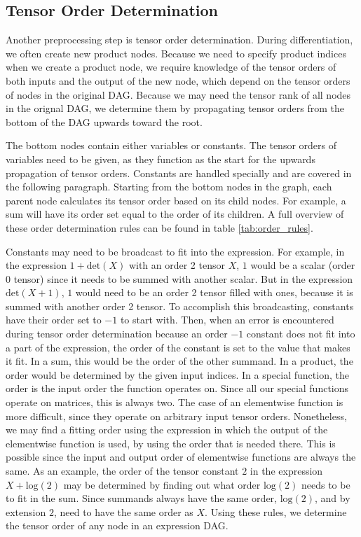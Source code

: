 \documentclass[12pt, a4paper]{report}
\begin{document}
\subsection{Tensor Order Determination}
Another preprocessing step is tensor order determination.
During differentiation, we often create new product nodes.
Because we need to specify product indices when we create a product node, we require knowledge of the tensor orders of both inputs and the output of the new node, which depend on the tensor orders of nodes in the original DAG.
Because we may need the tensor rank of all nodes in the orignal DAG, we determine them by propagating tensor orders from the bottom of the DAG upwards toward the root.

The bottom nodes contain either variables or constants.
The tensor orders of variables need to be given, as they function as the start for the upwards propagation of tensor orders.
Constants are handled specially and are covered in the following paragraph.
Starting from the bottom nodes in the graph, each parent node calculates its tensor order based on its child nodes.
For example, a sum will have its order set equal to the order of its children.
A full overview of these order determination rules can be found in table \ref{tab:order_rules}.

Constants may need to be broadcast to fit into the expression.
For example, in the expression $1 + \text{det}(X)$ with an order 2 tensor $X$, $1$ would be a scalar (order 0 tensor) since it needs to be summed with another scalar.
But in the expression $\text{det}(X + 1)$, $1$ would need to be an order 2 tensor filled with ones, because it is summed with another order 2 tensor.
To accomplish this broadcasting, constants have their order set to $-1$ to start with.
Then, when an error is encountered during tensor order determination because an order $-1$ constant does not fit into a part of the expression, the order of the constant is set to the value that makes it fit.
In a sum, this would be the order of the other summand.
In a product, the order would be determined by the given input indices.
In a special function, the order is the input order the function operates on. Since all our special functions operate on matrices, this is always two.
The case of an elementwise function is more difficult, since they operate on arbitrary input tensor orders.
Nonetheless, we may find a fitting order using the expression in which the output of the elementwise function is used, by using the order that is needed there.
This is possible since the input and output order of elementwise functions are always the same.
As an example, the order of the tensor constant $2$ in the expression $X + \text{log}(2)$ may be determined by finding out what order $\text{log}(2)$ needs to be to fit in the sum.
Since summands always have the same order, $\text{log}(2)$, and by extension $2$, need to have the same order as $X$.
Using these rules, we determine the tensor order of any node in an expression DAG.
\end{document}
